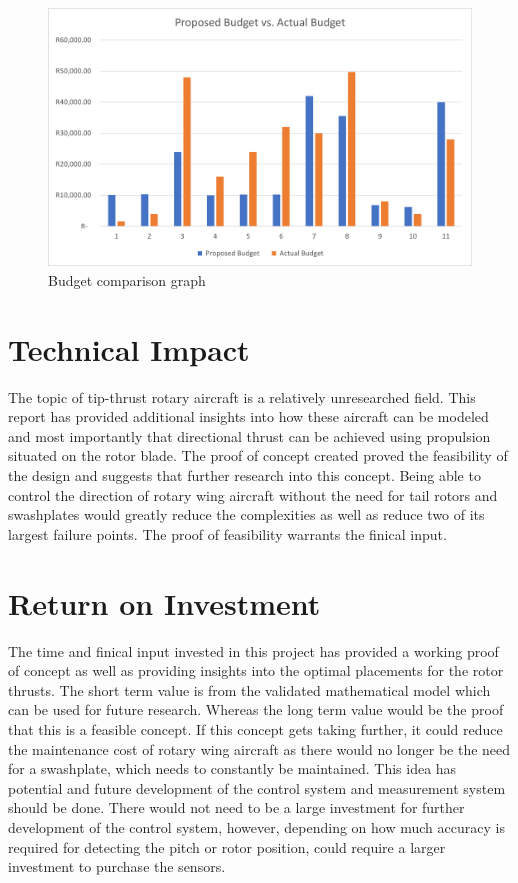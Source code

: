     \begin{figure} [H]               
        \centering
        \includegraphics*[width = 0.8\linewidth]{figs/Gantt Charts/Budget_Comparison.png}
        \caption{Budget comparison graph}
        \label{fig: budget_comparison_graph}
    \end{figure}

    \section{Technical Impact}
        The topic of tip-thrust rotary aircraft is a relatively unresearched field. This report has provided additional insights into how these aircraft can be modeled and most importantly that directional thrust can be achieved using propulsion situated on the rotor blade. The proof of concept created proved the feasibility of the design and suggests that further research into this concept. Being able to control the direction of rotary wing aircraft without the need for tail rotors and swashplates would greatly reduce the complexities as well as reduce two of its largest failure points. The proof of feasibility warrants the finical input. 

    \section{Return on Investment}
        The time and finical input invested in this project has provided a working proof of concept as well as providing insights into the optimal placements for the rotor thrusts. The short term value is from the validated mathematical model which can be used for future research. Whereas the long term value would be the proof that this is a feasible concept. If this concept gets taking further, it could reduce the maintenance cost of rotary wing aircraft as there would no longer be the need for a swashplate, which needs to constantly be maintained. This  idea has potential and future development of the control system and measurement system should be done. There would not need to be a large investment for further development of the control system, however, depending on how much accuracy is required for detecting the pitch or rotor position, could require a larger investment to purchase the sensors.

